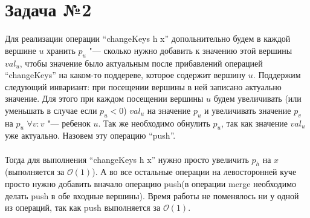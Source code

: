 \documentclass{article}
\begin{document}
\section*{Задача №2}
Для реализации операции ``changeKeys h x'' допольнительно будем в каждой вершине $u$ хранить $p_u$ "--- сколько нужно добавить к значению этой вершины $val_u$, чтобы значение было актуальным после прибавлений операцией ``changeKeys'' на каком-то поддереве, которое содержит вершину $u$. Поддержим следующий инвариант: при посещении вершины в ней записано актуально значение. Для этого при каждом посещении вершины $u$ будем увеличивать (или уменьшать в случае если $p_u < 0$)
$val_u$ на значение $p_u$ и увеличивать значение $p_v$ на $p_u$ $\forall v: v$ "--- ребенок $u$. Так же необходимо обнулить $p_u$, так как значение $val_u$ уже актуально. Назовем эту операцию ``push''.
\\\\
Тогда для выполнения ``changeKeys h x'' нужно просто увеличить $p_h$ на $x$ (выполняется за $\mathcal{O}(1)$). А во все остальные операции на левосторонней куче просто нужно добавить вначало операцию push(в операции merge необходимо делать push в обе входные вершины). Время работы не поменялось ни у одной из операций, так как push выполняется за $\mathcal{O}(1)$.
\end{document}
